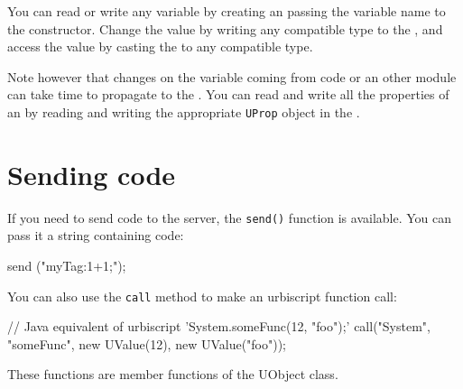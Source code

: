 You can read or write any \urbi variable by creating an \UVar passing the
variable name to the constructor. Change the value by writing any compatible
type to the \UVar, and access the value by casting the \UVar to any
compatible type.

Note however that changes on the variable coming from \urbi code or an other
module can take time to propagate to the \UVar.  You can read and write all
the \urbi properties of an \UVar by reading and writing the appropriate
\lstinline{UProp} object in the \UVar.

\section{Sending \urbi code}
\label{sec:uob:apijava:sendcode}

If you need to send \urbi code to the server, the \lstinline{send()} function
is available. You can pass it a string containing \urbi code:

\begin{urbiunchecked}
send ("myTag:1+1;");
\end{urbiunchecked}

You can also use the \lstinline{call} method to make an urbiscript function
call:

\begin{urbiunchecked}
// Java equivalent of urbiscript 'System.someFunc(12, "foo");'
call("System", "someFunc", new UValue(12), new UValue("foo"));
\end{urbiunchecked}

These functions are member functions of the UObject class.


